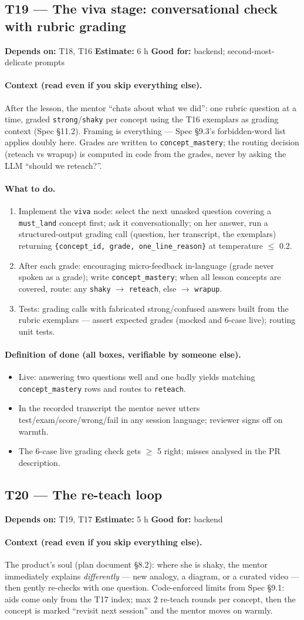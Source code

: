 \documentclass[11pt]{article}
\newcommand{\code}[1]{\texttt{#1}}
\newcommand{\taskmeta}[3]{\noindent\textbf{Depends on:} #1 \quad\textbullet\quad \textbf{Estimate:} #2 \quad\textbullet\quad \textbf{Good for:} #3\par\vspace{2pt}}
\newcommand{\ctx}[1]{\paragraph{Context (read even if you skip everything else).} #1}
\newcommand{\dod}{\paragraph{Definition of done (all boxes, verifiable by someone else).}}
\begin{document}
\subsection{T19 --- The viva stage: conversational check with rubric grading}
\taskmeta{T18, T16}{6 h}{backend; second-most-delicate prompts}
\ctx{After the lesson, the mentor ``chats about what we did'': one rubric question at a time, graded \code{strong}/\code{shaky} per concept using the T16 exemplars as grading context (Spec \S11.2). Framing is everything --- Spec \S9.3's forbidden-word list applies doubly here. Grades are written to \code{concept\_mastery}; the routing decision (reteach vs wrapup) is computed in code from the grades, never by asking the LLM ``should we reteach?''.}
\paragraph{What to do.}
\begin{enumerate}
  \item Implement the \code{viva} node: select the next unasked question covering a \code{must\_land} concept first; ask it conversationally; on her answer, run a structured-output grading call (question, her transcript, the exemplars) returning \code{\{concept\_id, grade, one\_line\_reason\}} at temperature $\leq$ 0.2.
  \item After each grade: encouraging micro-feedback in-language (grade never spoken as a grade); write \code{concept\_mastery}; when all lesson concepts are covered, route: any \code{shaky} \(\rightarrow\) \code{reteach}, else \(\rightarrow\) \code{wrapup}.
  \item Tests: grading calls with fabricated strong/confused answers built from the rubric exemplars --- assert expected grades (mocked and 6-case live); routing unit tests.
\end{enumerate}
\dod
\begin{itemize}
  \item Live: answering two questions well and one badly yields matching \code{concept\_mastery} rows and routes to \code{reteach}.
  \item In the recorded transcript the mentor never utters test/exam/score/wrong/fail in any session language; reviewer signs off on warmth.
  \item The 6-case live grading check gets $\geq$ 5 right; misses analysed in the PR description.
\end{itemize}

\subsection{T20 --- The re-teach loop}
\taskmeta{T19, T17}{5 h}{backend}
\ctx{The product's soul (plan document \S8.2): where she is shaky, the mentor immediately explains \emph{differently} --- new analogy, a diagram, or a curated video --- then gently re-checks with one question. Code-enforced limits from Spec \S9.1: aids come only from the T17 index; max 2 re-teach rounds per concept, then the concept is marked ``revisit next session'' and the mentor moves on warmly.}
\end{document}

